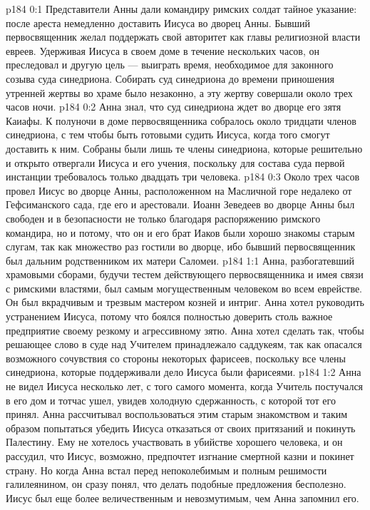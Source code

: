 \author{Комиссия срединников}
\vs p184 0:1 Представители Анны дали командиру римских солдат тайное указание: после ареста немедленно доставить Иисуса во дворец Анны. Бывший первосвященник желал поддержать свой авторитет как главы религиозной власти евреев. Удерживая Иисуса в своем доме в течение нескольких часов, он преследовал и другую цель --- выиграть время, необходимое для законного созыва суда синедриона. Собирать суд синедриона до времени приношения утренней жертвы во храме было незаконно, а эту жертву совершали около трех часов ночи.
\vs p184 0:2 Анна знал, что суд синедриона ждет во дворце его зятя Каиафы. К полуночи в доме первосвященника собралось около тридцати членов синедриона, с тем чтобы быть готовыми судить Иисуса, когда того смогут доставить к ним. Собраны были лишь те члены синедриона, которые решительно и открыто отвергали Иисуса и его учения, поскольку для состава суда первой инстанции требовалось только двадцать три человека.
\vs p184 0:3 Около трех часов провел Иисус во дворце Анны, расположенном на Масличной горе недалеко от Гефсиманского сада, где его и арестовали. Иоанн Зеведеев во дворце Анны был свободен и в безопасности не только благодаря распоряжению римского командира, но и потому, что он и его брат Иаков были хорошо знакомы старым слугам, так как множество раз гостили во дворце, ибо бывший первосвященник был дальним родственником их матери Саломеи.
\vs p184 1:1 Анна, разбогатевший храмовыми сборами, будучи тестем действующего первосвященника и имея связи с римскими властями, был самым могущественным человеком во всем еврействе. Он был вкрадчивым и трезвым мастером козней и интриг. Анна хотел руководить устранением Иисуса, потому что боялся полностью доверить столь важное предприятие своему резкому и агрессивному зятю. Анна хотел сделать так, чтобы решающее слово в суде над Учителем принадлежало саддукеям, так как опасался возможного сочувствия со стороны некоторых фарисеев, поскольку все члены синедриона, которые поддерживали дело Иисуса были фарисеями.
\vs p184 1:2 Анна не видел Иисуса несколько лет, с того самого момента, когда Учитель постучался в его дом и тотчас ушел, увидев холодную сдержанность, с которой тот его принял. Анна рассчитывал воспользоваться этим старым знакомством и таким образом попытаться убедить Иисуса отказаться от своих притязаний и покинуть Палестину. Ему не хотелось участвовать в убийстве хорошего человека, и он рассудил, что Иисус, возможно, предпочтет изгнание смертной казни и покинет страну. Но когда Анна встал перед непоколебимым и полным решимости галилеянином, он сразу понял, что делать подобные предложения бесполезно. Иисус был еще более величественным и невозмутимым, чем Анна запомнил его.
